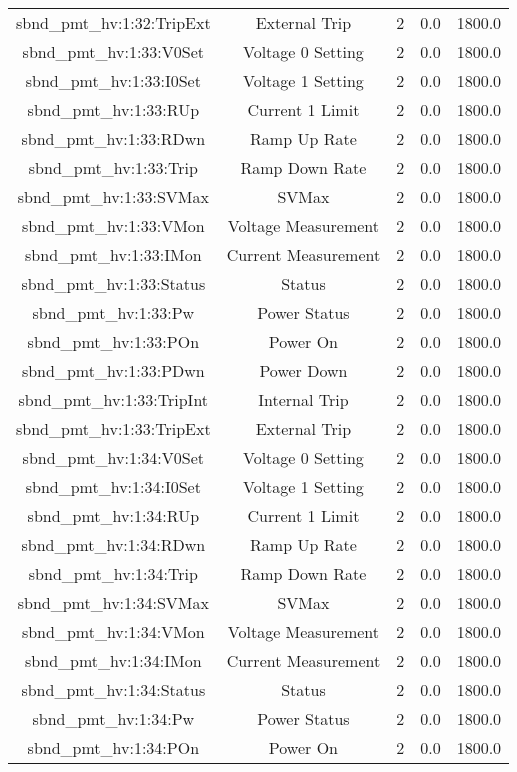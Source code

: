 \begin{table}[ptb]
\begin{tabular}{c | c c c c}
sbnd_pmt_hv:1:32:TripExt & External Trip & 2 & 0.0 & 1800.0\\ 
sbnd_pmt_hv:1:33:V0Set & Voltage 0 Setting & 2 & 0.0 & 1800.0\\ 
sbnd_pmt_hv:1:33:I0Set & Voltage 1 Setting & 2 & 0.0 & 1800.0\\ 
sbnd_pmt_hv:1:33:RUp & Current 1 Limit & 2 & 0.0 & 1800.0\\ 
sbnd_pmt_hv:1:33:RDwn & Ramp Up Rate & 2 & 0.0 & 1800.0\\ 
sbnd_pmt_hv:1:33:Trip & Ramp Down Rate & 2 & 0.0 & 1800.0\\ 
sbnd_pmt_hv:1:33:SVMax & SVMax & 2 & 0.0 & 1800.0\\ 
sbnd_pmt_hv:1:33:VMon & Voltage Measurement & 2 & 0.0 & 1800.0\\ 
sbnd_pmt_hv:1:33:IMon & Current Measurement & 2 & 0.0 & 1800.0\\ 
sbnd_pmt_hv:1:33:Status & Status & 2 & 0.0 & 1800.0\\ 
sbnd_pmt_hv:1:33:Pw & Power Status & 2 & 0.0 & 1800.0\\ 
sbnd_pmt_hv:1:33:POn & Power On & 2 & 0.0 & 1800.0\\ 
sbnd_pmt_hv:1:33:PDwn & Power Down & 2 & 0.0 & 1800.0\\ 
sbnd_pmt_hv:1:33:TripInt & Internal Trip & 2 & 0.0 & 1800.0\\ 
sbnd_pmt_hv:1:33:TripExt & External Trip & 2 & 0.0 & 1800.0\\ 
sbnd_pmt_hv:1:34:V0Set & Voltage 0 Setting & 2 & 0.0 & 1800.0\\ 
sbnd_pmt_hv:1:34:I0Set & Voltage 1 Setting & 2 & 0.0 & 1800.0\\ 
sbnd_pmt_hv:1:34:RUp & Current 1 Limit & 2 & 0.0 & 1800.0\\ 
sbnd_pmt_hv:1:34:RDwn & Ramp Up Rate & 2 & 0.0 & 1800.0\\ 
sbnd_pmt_hv:1:34:Trip & Ramp Down Rate & 2 & 0.0 & 1800.0\\ 
sbnd_pmt_hv:1:34:SVMax & SVMax & 2 & 0.0 & 1800.0\\ 
sbnd_pmt_hv:1:34:VMon & Voltage Measurement & 2 & 0.0 & 1800.0\\ 
sbnd_pmt_hv:1:34:IMon & Current Measurement & 2 & 0.0 & 1800.0\\ 
sbnd_pmt_hv:1:34:Status & Status & 2 & 0.0 & 1800.0\\ 
sbnd_pmt_hv:1:34:Pw & Power Status & 2 & 0.0 & 1800.0\\ 
sbnd_pmt_hv:1:34:POn & Power On & 2 & 0.0 & 1800.0\\ 

\end{tabular}
\end{table}
